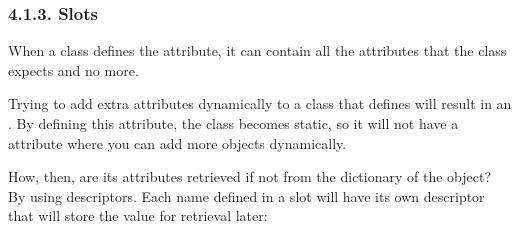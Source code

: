 \documentclass[a4paper,10pt,english]{sphinxmanual}
\begin{document}
\begin{sphinxVerbatim}[commandchars=\\\{\}]
 
      
      

     
          
         


 
 
\end{sphinxVerbatim}


\subsubsection{4.1.3. Slots}
\label{\detokenize{chapters/6_descriptors/index:slots}}
When a class defines the  attribute, it can contain all the attributes that the class
expects and no more.

Trying to add extra attributes dynamically to a class that defines  will result in
an . By defining this attribute, the class becomes static, so it will not have
a  attribute where you can add more objects dynamically.

How, then, are its attributes retrieved if not from the dictionary of the object? By using
descriptors. Each name defined in a slot will have its own descriptor that will store the
value for retrieval later:
\end{document}
